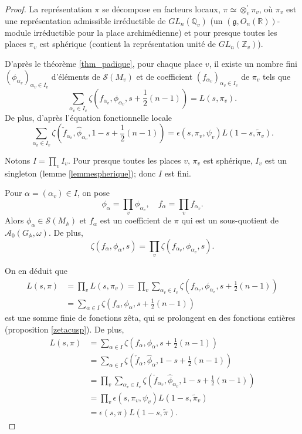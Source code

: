 \begin{proof}
La représentation $\pi$ se décompose en facteurs locaux,
$\pi \simeq \otimes_v^{'} \pi_v$, où $\pi_v$ est une représentation admissible irréductible de $GL_n(\mathbb{Q}_v)$ (un $(\mathfrak{g}, O_n(\mathbb{R}))$-module irréductible pour la place archimédienne) et pour presque toutes les places $\pi_v$ est sphérique (contient la représentation unité de $GL_n(\mathbb{Z}_v)$).

D'après le théorème \ref{thm_padique}, pour chaque place $v$, il existe un nombre fini $(\phi_{\alpha_v})_{\alpha_v \in I_v}$ d'éléments de $\mathcal{S}(M_v)$ et de coefficient $(f_{\alpha_v})_{\alpha_v \in I_v}$ de $\pi_v$ tels que
\begin{equation}
\sum_{\alpha_v \in I_v} \zeta(f_{\alpha_v}, \phi_{\alpha_v}, s + \frac{1}{2}(n-1)) = L(s, \pi_v).
\end{equation}
De plus, d'après l'équation fonctionnelle locale
\begin{equation}
\sum_{\alpha_v \in I_v} \zeta(\check{f}_{\alpha_v}, \hat{\phi}_{\alpha_v}, 1-s + \frac{1}{2}(n-1)) = \epsilon(s,\pi_v,\psi_v)L(1-s, \tilde{\pi}_v).
\end{equation}

Notons $I = \prod_v I_v$. Pour presque toutes les places $v$, $\pi_v$ est sphérique, $I_v$ est un singleton (lemme \ref{lemmespherique}); donc $I$ est fini.

Pour $\alpha = (\alpha_v) \in I$, on pose
\begin{equation}
\phi_\alpha = \prod_v \phi_{\alpha_v}, \quad f_\alpha = \prod_v f_{\alpha_v}.
\end{equation}
Alors $\phi_\alpha \in \mathcal{S}(M_\mathbb{A})$ et $f_\alpha$ est un coefficient de $\pi$ qui est un sous-quotient de $\mathcal{A}_0(G_\mathbb{A}, \omega)$. De plus,
\begin{equation}
\zeta(f_\alpha, \phi_\alpha, s) = \prod_v \zeta(f_{\alpha_v}, \phi_{\alpha_v}, s).
\end{equation}

On en déduit que
\begin{align}
L(s, \pi) &= \prod_v L(s, \pi_v) = \prod_v \sum_{\alpha_v \in I_v} \zeta(f_{\alpha_v}, \phi_{\alpha_v}, s + \frac{1}{2}(n-1)) \\
&= \sum_{\alpha \in I} \zeta(f_\alpha, \phi_\alpha, s + \frac{1}{2}(n-1))
\end{align}
est une somme finie de fonctions zêta, qui se prolongent en des fonctions entières (proposition \ref{zetacusp}). De plus,
\begin{align}
L(s, \pi) &= \sum_{\alpha \in I} \zeta(f_\alpha, \phi_\alpha, s + \frac{1}{2}(n-1)) \\
&= \sum_{\alpha \in I} \zeta(\check{f}_\alpha, \hat{\phi}_\alpha, 1 - s + \frac{1}{2}(n-1)) \\
&= \prod_v \sum_{\alpha_v \in I_v} \zeta(\check{f}_{\alpha_v}, \hat{\phi}_{\alpha_v}, 1-s + \frac{1}{2}(n-1)) \\
&= \prod_v \epsilon(s, \pi_v, \psi_v) L(1-s, \tilde{\pi}_v) \\
&= \epsilon(s, \pi)L(1-s, \tilde{\pi}).
\end{align}
\end{proof}